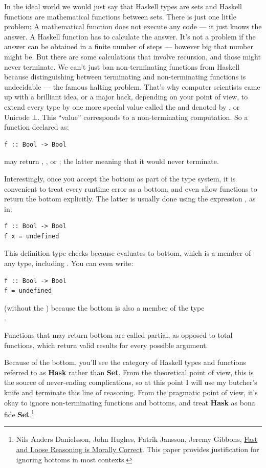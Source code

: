 In the ideal world we would just say that Haskell types are sets and
Haskell functions are mathematical functions between sets. There is just
one little problem: A mathematical function does not execute any code
--- it just knows the answer. A Haskell function has to calculate the
answer. It's not a problem if the answer can be obtained in a finite
number of steps --- however big that number might be. But there are some
calculations that involve recursion, and those might never terminate. We
can't just ban non-terminating functions from Haskell because
distinguishing between terminating and non-terminating functions is
undecidable --- the famous halting problem. That's why computer
scientists came up with a brilliant idea, or a major hack, depending on
your point of view, to extend every type by one more special value
called the  and denoted by \code{\_|\_}, or
Unicode \ensuremath{\bot}. This ``value'' corresponds to a non-terminating computation.
So a function declared as:

\begin{verbatim}
f :: Bool -> Bool
\end{verbatim}
may return , , or \code{\_|\_};
the latter meaning that it would never terminate.

Interestingly, once you accept the bottom as part of the type system, it
is convenient to treat every runtime error as a bottom, and even allow
functions to return the bottom explicitly. The latter is usually done
using the expression , as in:

\begin{verbatim}
f :: Bool -> Bool
f x = undefined
\end{verbatim}
This definition type checks because  evaluates to
bottom, which is a member of any type, including . You can
even write:

\begin{verbatim}
f :: Bool -> Bool
f = undefined
\end{verbatim}
(without the ) because the bottom is also a member of the type\\
.

Functions that may return bottom are called partial, as opposed to total
functions, which return valid results for every possible argument.

Because of the bottom, you'll see the category of Haskell types and
functions referred to as \textbf{Hask} rather than \textbf{Set}. From
the theoretical point of view, this is the source of never-ending
complications, so at this point I will use my butcher's knife and
terminate this line of reasoning. From the pragmatic point of view, it's
okay to ignore non-terminating functions and bottoms, and treat
\textbf{Hask} as bona fide \textbf{Set}.\footnote{Nils Anders Danielsson,
John Hughes, Patrik Jansson, Jeremy Gibbons, \href{http://www.cs.ox.ac.uk/jeremy.gibbons/publications/fast+loose.pdf}{
Fast and Loose Reasoning is Morally Correct}. This paper provides justification for ignoring bottoms in most contexts.}

